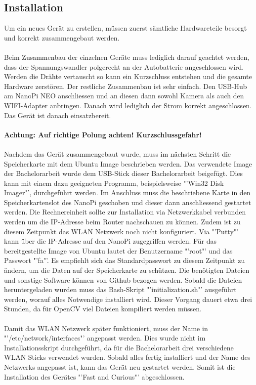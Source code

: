 \subsection{Installation}
Um ein neues Gerät zu erstellen, müssen zuerst sämtliche Hardwareteile besorgt und korrekt zusammengebaut werden.\\\\
Beim Zusammenbau der einzelnen Geräte muss lediglich darauf geachtet werden, dass der Spannungswandler polgerecht an der Autobatterie angeschlossen wird. Werden die Drähte vertauscht so kann ein Kurzschluss entstehen und die gesamte Hardware zerstören. Der restliche Zusammenbau ist sehr einfach. Den USB-Hub am NanoPi NEO anschliessen und an diesen dann sowohl Kamera als auch den WIFI-Adapter anbringen. Danach wird lediglich der Strom korrekt angeschlossen. Das Gerät ist danach einsatzbereit.\\\\
\textbf{Achtung: Auf richtige Polung achten! Kurzschlussgefahr!}\\\\
Nachdem das Gerät zusammengebaut wurde, muss im nächsten Schritt die Speicherkarte mit dem Ubuntu Image beschrieben werden. Das verwendete Image der Bachelorarbeit wurde dem USB-Stick dieser Bachelorarbeit beigefügt. Dies kann mit einem dazu geeigneten Programm, beispielsweise "'Win32 Disk Imager"', durchgeführt werden. Im Anschluss muss die beschriebene Karte in den Speicherkartenslot des NanoPi geschoben und dieser dann anschliessend gestartet werden. Die Rechnereinheit sollte zur Installation via Netzwerkkabel verbunden werden um die IP-Adresse beim Router nachschauen zu können. Zudem ist zu diesem Zeitpunkt das WLAN Netzwerk noch nicht konfiguriert. Via "'Putty"' kann über die IP-Adresse auf den NanoPi zugegriffen werden. Für das bereitgestellte Image von Ubuntu lautet der Benutzername "'root"' und das Passwort "'fa"'. Es empfiehlt sich das Standardpasswort zu diesem Zeitpunkt zu ändern, um die Daten auf der Speicherkarte zu schützen. Die benötigten Dateien und sonstige Software können von Github bezogen werden. Sobald die Dateien heruntergeladen wurden muss das Bash-Skript "'initialization.sh"' ausgeführt werden, worauf alles Notwendige installiert wird. Dieser Vorgang dauert etwa drei Stunden, da für OpenCV viel Dateien kompiliert werden müssen.\\\\
Damit das WLAN Netzwerk später funktioniert, muss der Name in "'/etc/network/interfaces"' angepasst werden. Dies wurde nicht im Installationsskript durchgeführt, da für die Bachelorarbeit drei verschiedene WLAN Sticks verwendet wurden. Sobald alles fertig installiert und der Name des Netzwerks angepasst ist, kann das Gerät neu gestartet werden. Somit ist die Installation des Gerätes "'Fast and Curious"' abgeschlossen.